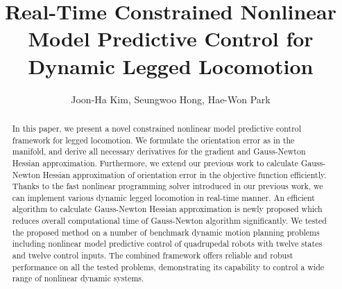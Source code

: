 \documentclass[conference]{IEEEtran}
\begin{document}
	\title{Real-Time Constrained Nonlinear Model Predictive Control for Dynamic Legged Locomotion}
	\author{Joon-Ha Kim, Seungwoo Hong, Hae-Won Park}
	\maketitle

\begin{abstract}
	 In this paper, we present a novel constrained nonlinear model predictive control framework for legged locomotion. We formulate the orientation error as in the manifold, and derive all necessary derivatives for the gradient and Gauss-Newton Hessian approximation. Furthermore, we extend our previous work to calculate Gauss-Newton Hessian approximation of orientation error in the objective function efficiently. Thanks to the fast nonlinear programming solver introduced in our previous work, we can implement various dynamic legged locomotion in real-time manner. An efficient algorithm to calculate Gauss-Newton Hessian approximation is newly proposed which reduces overall computational time of Gauss-Newton algorithm significantly. We tested the proposed method on a number of benchmark dynamic motion planning problems including nonlinear model predictive control of quadrupedal robots with twelve states and twelve control inputs. The combined framework offers reliable and robust performance on all the tested problems, demonstrating its capability to control a wide range of nonlinear dynamic systems.
	
	

\end{abstract}
\end{document}

